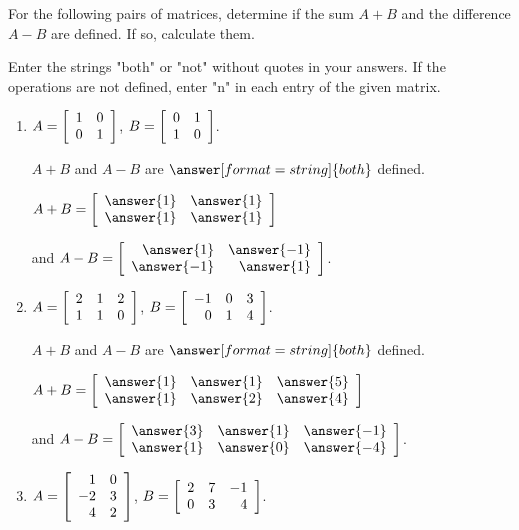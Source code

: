 \documentclass{ximera}
\author{Zack Reed}
\begin{document}
\begin{exercise}

  For the following pairs of matrices, determine if the sum $A+B$
  and the difference $A-B$ are defined. If so, calculate them.

  \begin{hint}
    Enter the strings "both" or "not" without quotes in your answers. If the operations are not defined, enter "n" in each entry of the given matrix.
  \end{hint}

  \begin{enumerate}
  \item
    $A = \startmat{rr}
      1 & 0 \\
      0 & 1
    \stopmat$,\quad
    $B = \startmat{rr}
      0 & 1 \\
      1 & 0
    \stopmat$.

    $A+B$ and $A-B$ are $\answer[format=string]{both}$ defined.
    
    $A + B = \startmat{rr}
      \answer{1} & \answer{1} \\
      \answer{1} & \answer{1}
    \stopmat$
  
    and $A - B = \startmat{rr}
      \answer{1} & \answer{-1} \\
      \answer{-1} & \answer{1}
    \stopmat$.

  \item %
    $A = \startmat{rrr}
      2 & 1 & 2 \\
      1 & 1 & 0
    \stopmat$,\quad
    $B = \startmat{rrr}
      -1 & 0 & 3 \\
      0 & 1 & 4
    \stopmat$.

    $A+B$ and $A-B$ are $\answer[format=string]{both}$ defined.

    $A + B = \startmat{rrr}
      \answer{1} & \answer{1} & \answer{5} \\
      \answer{1} & \answer{2} & \answer{4}
    \stopmat$

    and $A - B = \startmat{rrr}
      \answer{3} & \answer{1} & \answer{-1} \\
      \answer{1} & \answer{0} & \answer{-4}
    \stopmat$.

  \item %
    $A = \startmat{rr}
      1 & 0 \\
      -2 & 3 \\
      4 & 2
    \stopmat$,\quad
    $B = \startmat{rrr}
      2 & 7 & -1 \\
      0 & 3 & 4
    \stopmat$.


\end{enumerate}
\end{exercise}
\end{document}
